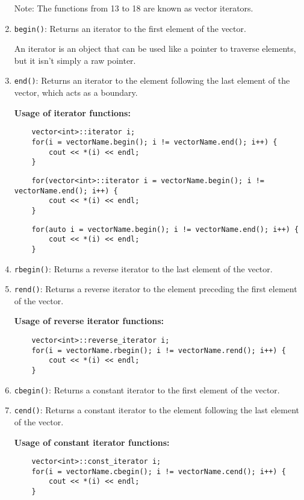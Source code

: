 \documentclass{article}
\begin{document}
\begin{enumerate}
    Note: The functions from 13 to 18 are known as vector iterators.

    \item \texttt{begin()}: Returns an iterator to the first element of the vector.
    
    An iterator is an object that can be used like a pointer to traverse elements, but it isn't simply a raw pointer.
    
    \item \texttt{end()}: Returns an iterator to the element following the last element of the vector, which acts as a boundary.
    
    \textbf{Usage of iterator functions:}

    \begin{lstlisting}
    vector<int>::iterator i;
    for(i = vectorName.begin(); i != vectorName.end(); i++) {
        cout << *(i) << endl;
    }
    \end{lstlisting}

    \begin{lstlisting}
    for(vector<int>::iterator i = vectorName.begin(); i != vectorName.end(); i++) {
        cout << *(i) << endl;
    }
    \end{lstlisting}

    \begin{lstlisting}
    for(auto i = vectorName.begin(); i != vectorName.end(); i++) {
        cout << *(i) << endl;
    }
    \end{lstlisting}

    \item \texttt{rbegin()}: Returns a reverse iterator to the last element of the vector.
    \item \texttt{rend()}: Returns a reverse iterator to the element preceding the first element of the vector.
    
    \textbf{Usage of reverse iterator functions:}

    \begin{lstlisting}
    vector<int>::reverse_iterator i;
    for(i = vectorName.rbegin(); i != vectorName.rend(); i++) {
        cout << *(i) << endl;
    }
    \end{lstlisting}

    \item \texttt{cbegin()}: Returns a constant iterator to the first element of the vector.
    \item \texttt{cend()}: Returns a constant iterator to the element following the last element of the vector.
    
    \textbf{Usage of constant iterator functions:}

    \begin{lstlisting}
    vector<int>::const_iterator i;
    for(i = vectorName.cbegin(); i != vectorName.cend(); i++) {
        cout << *(i) << endl;
    }
    \end{lstlisting}

\end{enumerate}
\end{document}
